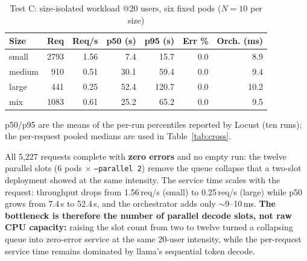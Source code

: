 \documentclass[conference]{IEEEtran}
\newcommand{\code}[1]{\texttt{#1}}
\begin{document}
\begin{table}[t]
\caption{Test C: size-isolated workload @20 users, six fixed pods ($N{=}10$ per size)}
\label{tab:size}
\centering\small\setlength{\tabcolsep}{4pt}
\begin{tabular}{@{}lrrrrrr@{}}
\toprule
Size & Req & Req/s & p50 (s) & p95 (s) & Err \% & Orch. (ms) \\
\midrule
small  & 2793 & 1.56 &  7.4 &  15.7 & 0.0 &  8.9 \\
medium &  910 & 0.51 & 30.1 &  59.4 & 0.0 &  9.4 \\
large  &  441 & 0.25 & 52.4 & 120.7 & 0.0 & 10.2 \\
mix    & 1083 & 0.61 & 25.2 &  65.2 & 0.0 &  9.5 \\
\bottomrule
\end{tabular}

\vspace{2pt}\footnotesize p50/p95 are the means of the per-run percentiles
reported by Locust (ten runs); the per-request pooled medians are used in
Table~\ref{tab:cross}.
\end{table}

All 5{,}227 requests complete with \textbf{zero errors} and no empty run: the
twelve parallel slots (6 pods $\times$ \code{--parallel 2}) remove the queue
collapse that a two-slot deployment showed at the same intensity. The service
time scales with the request: throughput drops from 1.56\,req/s (small) to
0.25\,req/s (large) while p50 grows from 7.4\,s to 52.4\,s, and the
orchestrator adds only $\sim$9--10\,ms. \textbf{The bottleneck is therefore the
number of parallel decode slots, not raw CPU capacity:} raising the slot count
from two to twelve turned a collapsing queue into zero-error service at the
same 20-user intensity, while the per-request service time remains dominated by
llama's sequential token decode.
\end{document}
